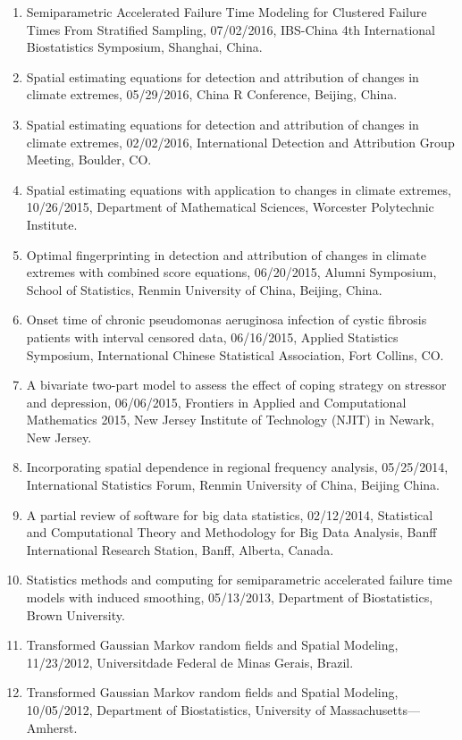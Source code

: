 \documentclass[Statistics]{vita}
\begin{document}
\begin{vita}
\begin{enumerate}
  \item Semiparametric Accelerated Failure Time Modeling for Clustered Failure Times From Stratified Sampling, 07/02/2016, IBS-China 4th International Biostatistics Symposium, Shanghai, China.
  \item Spatial estimating equations for detection and attribution of changes in climate extremes, 05/29/2016, China R Conference, Beijing, China.
  \item Spatial estimating equations for detection and attribution of changes in climate extremes, 02/02/2016, International Detection and Attribution Group Meeting, Boulder, CO\@.
  \item Spatial estimating equations with application to changes in climate extremes, 10/26/2015, Department of Mathematical Sciences, Worcester Polytechnic Institute.
  \item Optimal fingerprinting in detection and attribution of changes in climate extremes with combined score equations, 06/20/2015, Alumni Symposium, School of Statistics, Renmin University of China, Beijing, China.
  \item Onset time of chronic pseudomonas aeruginosa infection of cystic fibrosis patients with interval censored data, 06/16/2015, Applied Statistics Symposium, International Chinese Statistical Association, Fort Collins, CO\@.
  \item A bivariate two-part model to assess the effect of coping strategy on stressor and depression, 06/06/2015, Frontiers in Applied and Computational Mathematics 2015, New Jersey Institute of Technology (NJIT) in Newark, New Jersey.
  \item Incorporating spatial dependence in regional frequency analysis, 05/25/2014, International Statistics Forum, Renmin University of China, Beijing China.
  \item A partial review of software for big data statistics, 02/12/2014, Statistical and Computational Theory and Methodology for Big Data Analysis, Banff International Research Station, Banff, Alberta, Canada.
  \item Statistics methods and computing for semiparametric accelerated failure time models with induced smoothing, 05/13/2013, Department of Biostatistics, Brown University.
  \item Transformed Gaussian Markov random fields and Spatial Modeling, 11/23/2012, Universitdade Federal de Minas Gerais, Brazil.
  \item Transformed Gaussian Markov random fields and Spatial Modeling, 10/05/2012, Department of Biostatistics, University of Massachusetts---Amherst.

\end{enumerate}
\end{vita}
\end{document}
